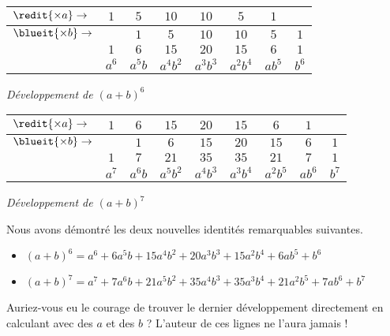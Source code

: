 \medskip
\begin{center}
\begin{tabular}{|l*{7}{|c}|}
	\hline
	$\redit{\times a} \rightarrow$	&
		$1$    &  $5$      &  $10$       &  $10$       &  $5$        &  $1$      &
	\\ \hline\hline
	$\blueit{\times b} \rightarrow$	&
		       &  $1$      &  $5$        &  $10$       &  $10$       &  $5$      &  $1$
	\\ \hline\hline\hline\hline
		&
		$1$    &  $6$      &  $15$       &  $20$       &  $15$       &  $6$      &  $1$
	\\ \hline
	    &
		$a^6$  &  $a^5 b$  &  $a^4 b^2$  &  $a^3 b^3$  &  $a^2 b^4$  &  $a b^5$  &  $b^6$
	\\ \hline
\end{tabular}

\smallskip
\itshape\small
Développement de $(a + b)^6$
\end{center}


\medskip
\begin{center}
\begin{tabular}{|l*{8}{|c}|}
	\hline
	$\redit{\times a} \rightarrow$	&
		$1$    &  $6$      &  $15$       &  $20$       &  $15$       &  $6$      &  $1$      &
	\\ \hline\hline
	$\blueit{\times b} \rightarrow$	&
		       &  $1$    &  $6$      &  $15$       &  $20$       &  $15$       &  $6$      &  $1$
	\\ \hline\hline\hline\hline
		&
		$1$    &  $7$      &  $21$       &  $35$       &  $35$       &  $21$       &  $7$      &  $1$
	\\ \hline
	    &
		$a^7$  &  $a^6 b$  &  $a^5 b^2$  &  $a^4 b^3$  &  $a^3 b^4$    &  $a^2 b^5$  &  $a b^6$  &  $b^7$
	\\ \hline
\end{tabular}

\smallskip
\itshape\small
Développement de $(a + b)^7$
\end{center}


\medskip

Nous avons démontré les deux nouvelles identités remarquables suivantes.

\begin{itemize}[label = \small\textbullet]
	\item $(a + b)^6 = a^6 + 6 a^5 b + 15 a^4 b^2 + 20 a^3 b^3 + 15 a^2 b^4 + 6 a b^5 + b^6$

	\item $(a + b)^7 = a^7 + 7 a^6 b + 21 a^5 b^2 + 35 a^4 b^3 + 35 a^3 b^4 + 21 a^2 b^5 + 7 a b^6 + b^7$
\end{itemize}

\medskip

Auriez-vous eu le courage de trouver le dernier développement directement en calculant avec des $a$ et des $b$ ? L'auteur de ces lignes ne l'aura jamais !

